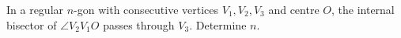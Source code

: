 In a regular $n$-gon with consecutive vertices $V_1,V_2,V_3$ and centre $O$, the internal bisector of $\angle V_2V_1O$ passes through $V_3$. Determine $n$.
